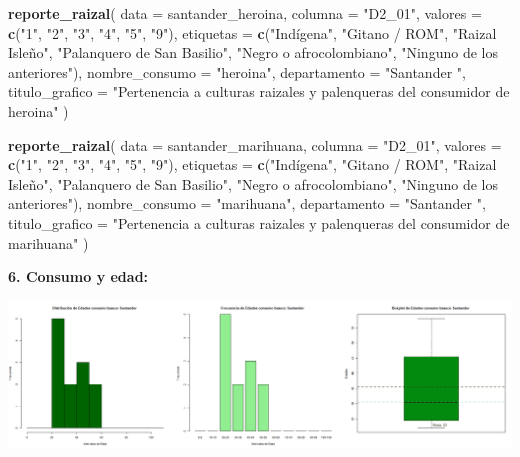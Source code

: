\documentclass[
]{article}
\newenvironment{Shaded}{\begin{snugshade}}{\end{snugshade}}
\newcommand{\AttributeTok}[1]{\textcolor[rgb]{0.13,0.29,0.53}{#1}}
\newcommand{\FunctionTok}[1]{\textcolor[rgb]{0.13,0.29,0.53}{\textbf{#1}}}
\newcommand{\NormalTok}[1]{#1}
\newcommand{\StringTok}[1]{\textcolor[rgb]{0.31,0.60,0.02}{#1}}
\begin{document}
\begin{Shaded}
\begin{Highlighting}[]
\FunctionTok{reporte\_raizal}\NormalTok{(}
  \AttributeTok{data =}\NormalTok{ santander\_heroina,}
  \AttributeTok{columna =} \StringTok{"D2\_01"}\NormalTok{,}
  \AttributeTok{valores =} \FunctionTok{c}\NormalTok{(}\StringTok{"1"}\NormalTok{, }\StringTok{"2"}\NormalTok{, }\StringTok{"3"}\NormalTok{, }\StringTok{"4"}\NormalTok{, }\StringTok{"5"}\NormalTok{, }\StringTok{"9"}\NormalTok{),}
  \AttributeTok{etiquetas =} \FunctionTok{c}\NormalTok{(}\StringTok{"Indígena"}\NormalTok{, }\StringTok{"Gitano / ROM"}\NormalTok{, }\StringTok{"Raizal Isleño"}\NormalTok{, }\StringTok{"Palanquero de San Basilio"}\NormalTok{, }\StringTok{"Negro o afrocolombiano"}\NormalTok{, }\StringTok{"Ninguno de los anteriores"}\NormalTok{),}
  \AttributeTok{nombre\_consumo =} \StringTok{"heroina"}\NormalTok{,}
  \AttributeTok{departamento =} \StringTok{"Santander "}\NormalTok{,}
  \AttributeTok{titulo\_grafico =} \StringTok{"Pertenencia a culturas raizales y palenqueras del consumidor de heroina"}
\NormalTok{)}

\FunctionTok{reporte\_raizal}\NormalTok{(}
  \AttributeTok{data =}\NormalTok{ santander\_marihuana,}
  \AttributeTok{columna =} \StringTok{"D2\_01"}\NormalTok{,}
  \AttributeTok{valores =} \FunctionTok{c}\NormalTok{(}\StringTok{"1"}\NormalTok{, }\StringTok{"2"}\NormalTok{, }\StringTok{"3"}\NormalTok{, }\StringTok{"4"}\NormalTok{, }\StringTok{"5"}\NormalTok{, }\StringTok{"9"}\NormalTok{),}
  \AttributeTok{etiquetas =} \FunctionTok{c}\NormalTok{(}\StringTok{"Indígena"}\NormalTok{, }\StringTok{"Gitano / ROM"}\NormalTok{, }\StringTok{"Raizal Isleño"}\NormalTok{, }\StringTok{"Palanquero de San Basilio"}\NormalTok{, }\StringTok{"Negro o afrocolombiano"}\NormalTok{, }\StringTok{"Ninguno de los anteriores"}\NormalTok{),}
  \AttributeTok{nombre\_consumo =} \StringTok{"marihuana"}\NormalTok{,}
  \AttributeTok{departamento =} \StringTok{"Santander "}\NormalTok{,}
  \AttributeTok{titulo\_grafico =} \StringTok{"Pertenencia a culturas raizales y palenqueras del consumidor de marihuana"}
\NormalTok{)}
\end{Highlighting}
\end{Shaded}

\hfill\break
\textbf{6. Consumo y edad:}

\includegraphics{images/basuco edad santander.png}
\end{document}
